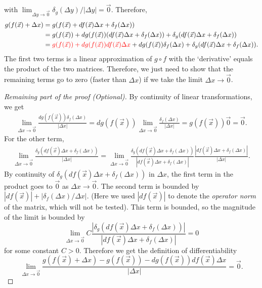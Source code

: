 with $\lim_{\Delta y\to \vec{0}} \delta_g(\Delta y) / |\Delta y| = \vec{0} $.
Therefore,\begin{align*}
    g(f(\vec{x})+ \Delta x) &= g(f(\vec{x}) + df(\vec{x}) \Delta x + \delta_f(\Delta x))\\
    &= g(f(\vec{x}))+ dg(f(\vec{x}))(df(\vec{x}) \Delta x + \delta_f(\Delta x))+\delta_g(df(\vec{x}) \Delta x + \delta_f(\Delta x))\\
    &= \textcolor{red}{g(f(\vec{x}))+ dg(f(\vec{x}))df(\vec{x}) \Delta x }+ dg(f(\vec{x}))\delta_f(\Delta x)+\delta_g(df(\vec{x}) \Delta x + \delta_f(\Delta x)).
\end{align*}
The first two terms is a linear approximation of $g\circ f$ with the `derivative' equals the product of the two matrices. Therefore, we just need to show that the remaining terms go to zero (faster than $\Delta x$) if we take the limit $\Delta x\to\vec{0}$.
\begin{proof}[Remaining part of the proof (Optional)]
    By continuity of linear transformations, we get \begin{align*}
        \lim_{\Delta x\to\vec{0}} \frac{ dg(f(\vec{x}))\delta_f(\Delta x)}{|\Delta x|} =dg(f(\vec{x}))  \lim_{\Delta x\to\vec{0}} \frac{ \delta_f(\Delta x)}{|\Delta x|} = g(f(\vec{x})) \vec{0}=\vec{0}.
    \end{align*}
    For the other term, \begin{align*}
        \lim_{\Delta x\to\vec{0}}\frac{\delta_g(df(\vec{x}) \Delta x + \delta_f(\Delta x))}{|\Delta x|} = \lim_{\Delta x\to\vec{0}}\frac{\delta_g(df(\vec{x}) \Delta x + \delta_f(\Delta x))}{|df(\vec{x}) \Delta x + \delta_f(\Delta x)|}\frac{|df(\vec{x}) \Delta x + \delta_f(\Delta x)|}{|\Delta x|}.
    \end{align*}
    By continuity of $\delta_g(df(\vec{x}) \Delta x + \delta_f(\Delta x))$ in $\Delta x$, the first term in the product goes to $\vec{0}$ as $\Delta x\to\vec{0}$. The second term is bounded by $|df(\vec{x})| + |\delta_f(\Delta x)/\Delta x|$. (Here we used $|df(\vec{x})|$ to denote the \textit{operator norm} of the matrix, which will not be tested). This term is bounded, so the magnitude of the limit is bounded by \[
        \lim_{\Delta x\to\vec{0}} C\frac{|\delta_g(df(\vec{x}) \Delta x + \delta_f(\Delta x))|}{|df(\vec{x}) \Delta x + \delta_f(\Delta x)|} = 0
    \]
    for some constant $C>0$. Therefore we get the definition of differentiability  \[
        \lim_{\Delta x\to\vec{0}} \frac{ g(f(\vec{x})+ \Delta x) - g(f(\vec{x}))- dg(f(\vec{x}))df(\vec{x}) \Delta x }{|\Delta x|}=\vec{0}.
    \]
\end{proof}
